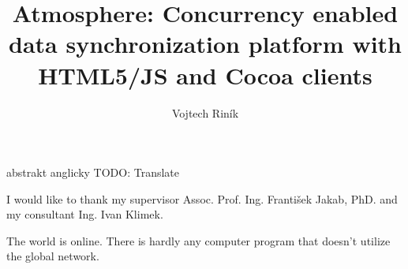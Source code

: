 \documentclass[]{tukethesis}
\author{Vojtech Riník}
\title{Atmosphere: Concurrency enabled data synchronization platform with HTML5/JS and Cocoa clients}
\subtitle{}
\begin{document}
\renewcommand\theHfigure{\theHsection.\arabic{figure}}
\renewcommand\theHtable{\theHsection.\arabic{table}}

\firstpage

\titlepage


% 
% 

\abstrakte %
abstrakt anglicky
\abstrakt %
TODO: Translate
\endabstract %

\assignthesis

\declaration

\acknowledgement %
I would like to thank my supervisor Assoc. Prof. Ing. František Jakab, PhD. and my consultant Ing. Ivan Klimek. 
\endacknowledgement

\preface %
The world is online. There is hardly any computer program that doesn’t utilize the global network. 
\end{document}
